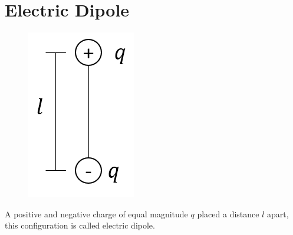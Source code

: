 \documentclass[12pt]{article}
\theoremstyle{definition}
\begin{document}
\section{Electric Dipole}
\begin{figure}[h]
    \centering
    \includegraphics[scale=.75]{8.png}
\end{figure}
A positive and negative charge of equal magnitude $ q $ placed a distance $ l $ apart, this configuration is called electric dipole.
\end{document}
